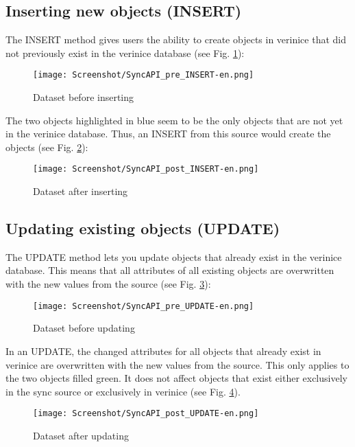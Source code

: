 \documentclass[a4paper,10pt]{book}
\begin{document}
\subsection{Inserting new objects (INSERT)}
The INSERT method gives users the ability to create objects in verinice that did not previously exist in the verinice database (see Fig. \ref{Dataset before inserting}):
\newline
\begin{figure}[htb!]
  \centering
  \texttt{[image: Screenshot/SyncAPI\_pre\_INSERT-en.png]}
  \caption{\label{Dataset before inserting} Dataset before inserting}
\end{figure}
\newline
The two objects highlighted in blue seem to be the only objects that are not yet in the verinice database.
Thus, an \textsc{INSERT} from this source would create the objects (see Fig. \ref{Dataset after inserting}):
\newline
\begin{figure}[htb!]
  \centering
  \texttt{[image: Screenshot/SyncAPI\_post\_INSERT-en.png]}
  \caption{\label{Dataset after inserting} Dataset after inserting}
\end{figure}
\newline

\subsection{Updating existing objects (UPDATE)}
The UPDATE method lets you update objects that already exist in the verinice database. This means that all attributes of all
existing objects are overwritten with the new values from the source (see Fig. \ref{Dataset before updating}):
\newline
\begin{figure}[htb!]
  \centering
  \texttt{[image: Screenshot/SyncAPI\_pre\_UPDATE-en.png]}
  \caption{\label{Dataset before updating} Dataset before updating}
\end{figure}
\newline
In an \textsc{UPDATE}, the changed attributes for all objects that already exist in verinice are overwritten with
the new values from the source. This only applies to the two objects filled green. It does not affect objects
that exist either exclusively in the sync source or exclusively in verinice (see Fig. \ref{Dataset after updating}).
\begin{figure}[htb!]
  \centering
  \texttt{[image: Screenshot/SyncAPI\_post\_UPDATE-en.png]}
  \caption{\label{Dataset after updating} Dataset after updating}
\end{figure}
\newline
\end{document}
